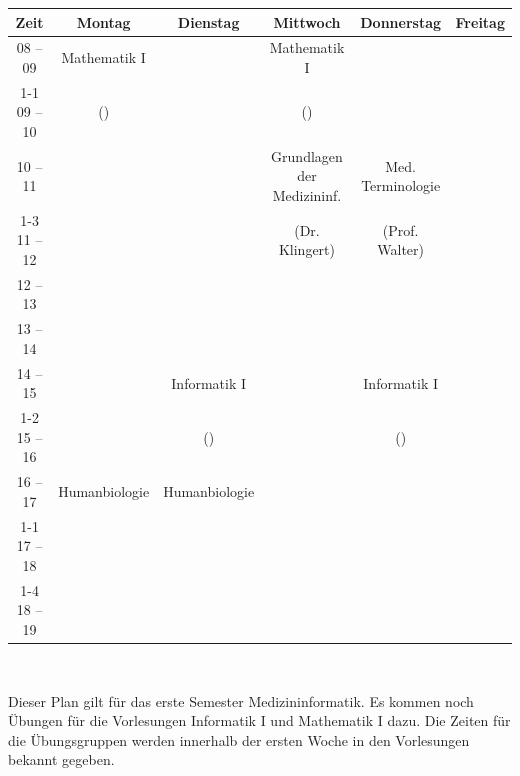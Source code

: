 \begin{minipage}{\textwidth}
    \footnotesize
\begin{center}
\begin{tabular}{|c|c|c|c|c|c|}
	\hline
	Zeit    & Montag       	& Dienstag    	& Mittwoch                  	& Donnerstag		& Freitag   \\\hline\hline
	08 – 09 & Mathematik I 	&             	& Mathematik I              	&			&			\\\cline{1-1}\cline{3-3}\cline{5-6}
	09 – 10 & (\Matheprof) 	&             	& (\Matheprof)              	&   			&			\\\hline
	10 – 11 &              	&             	& Grundlagen der Medizininf.	& Med. Terminologie&			\\\cline{1-3}\cline{5-6}
	11 – 12 &              	&             	& (Dr. Klingert)						       	& (Prof. Walter)&			\\\hline
	12 – 13 &              	&             	&                           	&			&			\\\hline
	13 – 14 &              	&             	&                           	&			&			\\\hline
	14 – 15 &              	& Informatik I	&                           	& Informatik I		&			\\\cline{1-2}\cline{4-4}\cline{6-6}
	15 – 16 &              	& (\Infoprof) 	&                           	& (\Infoprof)		&			\\\hline
	16 – 17 & Humanbiologie	& Humanbiologie &                           	&			&			\\\cline{1-1}\cline{4-6}
	17 – 18 &              	&             	&                           	& 			&			\\\cline{1-4}\cline{6-6}
 	18 – 19 &              	&             	&                           	& 			&			\\\hline
\end{tabular}
    ~\\
\end{center}
\end{minipage}

Dieser Plan gilt für das erste Semester Medizininformatik. Es kommen noch Übungen für die Vorlesungen
Informatik I und Mathematik I dazu. Die Zeiten für die Übungsgruppen werden innerhalb der ersten Woche in den Vorlesungen bekannt gegeben. \\ \\
